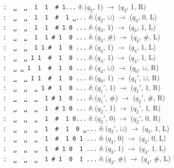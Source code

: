 \texttt{:\ \ ␣\ \ ␣\ \ 1\ \ 1\ \ \#\ \textbar{}1\textbar{}...}
\(\delta:\)(\(q_2\), 1) \(\to\) (\(q_2\), 1, R)\\
\texttt{:\ \ ␣\ \ ␣\ \ 1\ \ 1\ \ \#\ \ 1\ \textbar{}␣\textbar{}...}
\(\delta:\)(\(q_2\), \(\sqcup\)) \(\to\) (\(q_3\), 0, L)\\
\texttt{:\ \ ␣\ \ ␣\ \ 1\ \ 1\ \ \#\ \textbar{}1\textbar{}\ 0\ ...}
\(\delta:\)(\(q_3\), 1) \(\to\) (\(q_3\), 1, L)\\
\texttt{:\ \ ␣\ \ ␣\ \ 1\ \ 1\ \textbar{}\#\textbar{}\ 1\ \ 0\ ...}
\(\delta:\)(\(q_3\), \#) \(\to\) (\(q_4\), \#, L)\\
\texttt{:\ \ ␣\ \ ␣\ \ 1\ \textbar{}1\textbar{}\ \#\ \ 1\ \ 0\ ...}
\(\delta:\)(\(q_4\), 1) \(\to\) (\(q_4\), 1, L)\\
\texttt{:\ \ ␣\ \ ␣\ \textbar{}1\textbar{}\ 1\ \ \#\ \ 1\ \ 0\ ...}
\(\delta:\)(\(q_4\), 1) \(\to\) (\(q_4\), 1, L)\\
\texttt{:\ \ ␣\ \textbar{}␣\textbar{}\ 1\ \ 1\ \ \#\ \ 1\ \ 0\ ...}
\(\delta:\)(\(q_4\), \(\sqcup\)) \(\to\) (\(q_0\), \(\sqcup\), R)\\
\texttt{:\ \ ␣\ \ ␣\ \textbar{}1\textbar{}\ 1\ \ \#\ \ 1\ \ 0\ ...}
\(\delta:\)(\(q_0\), 1) \(\to\) (\(q_1'\), \(\sqcup\), R)\\
\texttt{:\ \ ␣\ \ ␣\ \ ␣\ \textbar{}1\textbar{}\ \#\ \ 1\ \ 0\ ...}
\(\delta:\)(\(q_1'\), 1) \(\to\) (\(q_1'\), 1, R)\\
\texttt{:\ \ ␣\ \ ␣\ \ ␣\ \ 1\ \textbar{}\#\textbar{}\ 1\ \ 0\ ...}
\(\delta:\)(\(q_1'\), \#) \(\to\) (\(q_2'\), \#, R)\\
\texttt{:\ \ ␣\ \ ␣\ \ ␣\ \ 1\ \ \#\ \textbar{}1\textbar{}\ 0\ ...}
\(\delta:\)(\(q_2'\), 1) \(\to\) (\(q_2'\), 1, R)\\
\texttt{:\ \ ␣\ \ ␣\ \ ␣\ \ 1\ \ \#\ \ 1\ \textbar{}0\textbar{}...}
\(\delta:\)(\(q_2'\), 0) \(\to\) (\(q_2'\), 0, R)\\
\texttt{:\ \ ␣\ \ ␣\ \ ␣\ \ 1\ \ \#\ \ 1\ \ 0\ \textbar{}␣\textbar{}...}
\(\delta:\)(\(q_2'\), \(\sqcup\)) \(\to\) (\(q_3\), 1, L)\\
\texttt{:\ \ ␣\ \ ␣\ \ ␣\ \ 1\ \ \#\ \ 1\ \textbar{}0\textbar{}\ 1\ ...}
\(\delta:\)(\(q_3\), 0) \(\to\) (\(q_3\), 0, L)\\
\texttt{:\ \ ␣\ \ ␣\ \ ␣\ \ 1\ \ \#\ \textbar{}1\textbar{}\ 0\ \ 1\ ...}
\(\delta:\)(\(q_3\), 1) \(\to\) (\(q_3\), 1, L)\\
\texttt{:\ \ ␣\ \ ␣\ \ ␣\ \ 1\ \textbar{}\#\textbar{}\ 1\ \ 0\ \ 1\ ...}
\(\delta:\)(\(q_3\), \#) \(\to\) (\(q_4\), \#, L)\\
